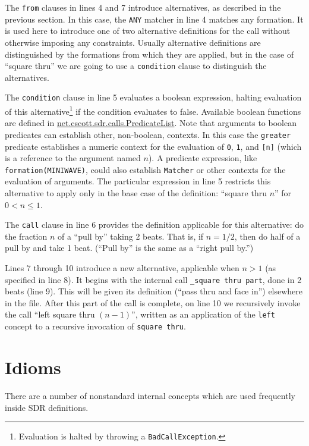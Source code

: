 \documentclass[12pt]{article}
\newcommand{\clause}[1]{\texttt{#1}}
\renewcommand{\call}[1]{\texttt{#1}} %
\newcommand{\package}[1]{\url{#1}}
\begin{document}
The \clause{from} clauses in lines 4 and 7 introduce alternatives, as
described in the previous section.  In this case, the \texttt{ANY}
matcher in line 4 matches any formation.  It is used here to introduce
one of two alternative definitions for the call without otherwise
imposing any constraints.  Usually alternative definitions are
distinguished by the formations from which they are applied, but in
the case of ``square thru'' we are going to use a \clause{condition}
clause to distinguish the alternatives.

The \clause{condition} clause in line 5 evaluates a boolean
expression, halting evaluation of this alternative\footnote{Evaluation
  is halted by throwing a \texttt{BadCallException}.} if the condition
evaluates to false.  Available boolean functions are defined in
\package{net.cscott.sdr.calls.PredicateList}.  Note that arguments to
boolean predicates can establish other, non-boolean, contexts.  In
this case the \call{greater} predicate establishes a numeric context
for the evaluation of \texttt{0}, \texttt{1}, and \texttt{[n]} (which
is a reference to the argument named $n$).  A predicate expression,
like \texttt{formation(MINIWAVE)}, could also establish
\texttt{Matcher} or other contexts for the evaluation of arguments.
The particular expression in line 5 restricts this alternative to
apply only in the base case of the definition: ``square thru $n$'' for
$0 < n \leq 1$.

The \clause{call} clause in line 6 provides the definition
applicable for this alternative: do the fraction $n$ of a
``pull by'' taking 2 beats.  That is, if $n=1/2$, then do half of a
pull by and take 1 beat.  (``Pull by'' is the same as a ``right pull by.'')

Lines 7 through 10 introduce a new alternative, applicable when $n>1$
(as specified in line 8).
It begins with the internal call \call{\_square thru part}, done in 2
beats (line 9).  This will be given its definition (``pass thru and face in'')
elsewhere in the file.  After this part of the call is complete, on
line 10 we recursively
invoke the call ``left square thru $(n-1)$'', written as an application
of the \call{left} concept to a recursive invocation of \call{square thru}.

\section{Idioms}
There are a number of nonstandard internal concepts which are used
frequently inside SDR definitions.
\end{document}
